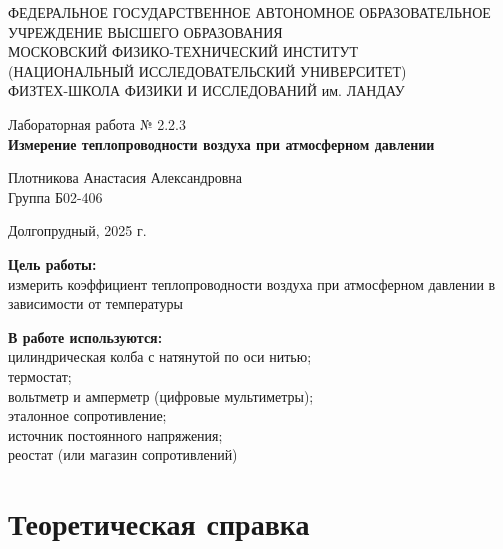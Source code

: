 \documentclass[a4paper,12pt]{article} %
\begin{document}
\begin{center}
	\footnotesize{ФЕДЕРАЛЬНОЕ ГОСУДАРСТВЕННОЕ АВТОНОМНОЕ ОБРАЗОВАТЕЛЬНОЕ 			УЧРЕЖДЕНИЕ ВЫСШЕГО ОБРАЗОВАНИЯ}\\
	\footnotesize{МОСКОВСКИЙ ФИЗИКО-ТЕХНИЧЕСКИЙ ИНСТИТУТ\\(НАЦИОНАЛЬНЫЙ 			ИССЛЕДОВАТЕЛЬСКИЙ УНИВЕРСИТЕТ)}\\
	\footnotesize{ФИЗТЕХ-ШКОЛА ФИЗИКИ И ИССЛЕДОВАНИЙ им. ЛАНДАУ\\}
	\hfill \break
	\hfill \break
	\hfill \break
	\hfill \break
\end{center}

\begin{center}   
    \hfill \break
	\hfill \break
	\hfill \break
	\hfill \break    \hfill \break
	\hfill \break
	\hfill \break
	\hfill \break
    \hfill \break
    \hfill \break
	\hfill \break
	\large{Лабораторная работа № 2.2.3\\\textbf{Измерение теплопроводности воздуха при атмосферном давлении}}\\
	\begin{flushright}
		Плотникова Анастасия Александровна\\
		Группа Б02-406
	\end{flushright}
	\hfill \break
	\hfill \break
	\hfill \break
\end{center}
\hfill \break
\hfill \break
\hfill \break
\hfill \break
\hfill \break
\hfill \break
\hfill \break
\hfill \break
\hfill \break
\hfill \break
\hfill \break
\hfill \break
\hfill \break
\begin{center}
	Долгопрудный, 2025 г.
\end{center}
\thispagestyle{empty}
\newpage
	\textbf{Цель работы:}\\ 
  измерить коэффициент теплопроводности воздуха при атмосферном
давлении в зависимости от температуры
	\hfill \break
	
	\textbf{В работе используются:}\\ 
  цилиндрическая колба с натянутой по оси нитью; \\
  термостат; \\
  вольтметр и амперметр (цифровые мультиметры); \\
  эталонное сопротивление; \\
  источник постоянного напряжения; \\
  реостат (или магазин сопротивлений)

\section*{Теоретическая справка}
\end{document}
